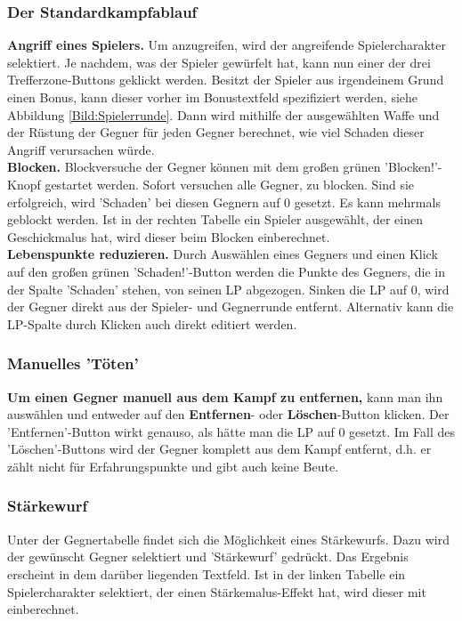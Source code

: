 \documentclass[11pt, a4paper, german]{article}
\begin{document}
\subsubsection{Der Standardkampfablauf}\label{Abschnitt:standardkampf}
\textbf{Angriff eines Spielers.} Um anzugreifen, wird der angreifende Spielercharakter selektiert. Je nachdem, was der Spieler gewürfelt hat, kann nun einer der drei Trefferzone-Buttons geklickt werden. Besitzt der Spieler aus irgendeinem Grund einen Bonus, kann dieser vorher im Bonustextfeld spezifiziert werden, siehe Abbildung \ref{Bild:Spielerrunde}. Dann wird mithilfe der ausgewählten Waffe und der Rüstung der Gegner für jeden Gegner berechnet, wie viel Schaden dieser Angriff verursachen würde.\\

\textbf{Blocken.} Blockversuche der Gegner können mit dem großen grünen 'Blocken!'-Knopf gestartet werden. Sofort versuchen alle Gegner, zu blocken. Sind sie erfolgreich, wird 'Schaden' bei diesen Gegnern auf 0 gesetzt. Es kann mehrmals geblockt werden. Ist in der rechten Tabelle ein Spieler ausgewählt, der einen Geschickmalus hat, wird dieser beim Blocken einberechnet.\\

\textbf{Lebenspunkte reduzieren.} Durch Auswählen eines Gegners und einen Klick auf den großen grünen 'Schaden!'-Button werden die Punkte des Gegners, die in der Spalte 'Schaden' stehen, von seinen LP abgezogen. Sinken die LP auf 0, wird der Gegner direkt aus der Spieler- und Gegnerrunde entfernt. Alternativ kann die LP-Spalte durch Klicken auch direkt editiert werden.

\subsubsection{Manuelles 'Töten'}

\textbf{Um einen Gegner manuell aus dem Kampf zu entfernen,} kann man ihn auswählen und entweder auf den \textbf{Entfernen}- oder \textbf{Löschen}-Button klicken. Der 'Entfernen'-Button wirkt genauso, als hätte man die LP auf 0 gesetzt. Im Fall des 'Löschen'-Buttons wird der Gegner komplett aus dem Kampf entfernt, d.h. er zählt nicht für Erfahrungspunkte und gibt auch keine Beute.

\subsubsection{Stärkewurf}\label{Abschnitt:staerkewurf}
Unter der Gegnertabelle findet sich die Möglichkeit eines Stärkewurfs. Dazu wird der gewünscht Gegner selektiert und 'Stärkewurf' gedrückt. Das Ergebnis erscheint in dem darüber liegenden Textfeld. Ist in der linken Tabelle ein Spielercharakter selektiert, der einen Stärkemalus-Effekt hat, wird dieser mit einberechnet.
\end{document}
